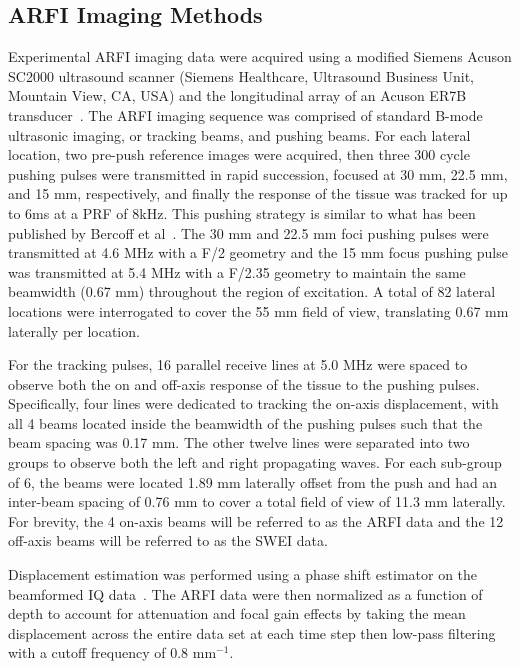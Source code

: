 \subsection{ARFI Imaging Methods}
Experimental ARFI imaging data were acquired using a modified Siemens Acuson
SC2000 ultrasound scanner (Siemens Healthcare, Ultrasound Business Unit,
Mountain View, CA, USA) and the longitudinal array of an Acuson ER7B
transducer~\cite{Rosenzweig2012}.  The ARFI imaging sequence was comprised of
standard B-mode ultrasonic imaging, or tracking beams, and pushing beams. For
each lateral location, two pre-push reference images were acquired, then three
300 cycle pushing pulses were transmitted in rapid succession, focused at 30
mm, 22.5 mm, and 15 mm, respectively, and finally the response of the tissue
was tracked for up to 6ms at a PRF of 8kHz. This pushing strategy is similar to
what has been published by Bercoff et al~\cite{BercoffSSI}. The 30 mm and 22.5
mm foci pushing pulses were transmitted at 4.6 MHz with a F/2 geometry and the
15 mm focus pushing pulse was transmitted at 5.4 MHz with a F/2.35 geometry to
maintain the same beamwidth (0.67 mm) throughout the region of excitation. A
total of 82 lateral locations were interrogated to cover the 55 mm field of
view, translating 0.67 mm laterally per location.

For the tracking pulses, 16 parallel receive lines at 5.0 MHz were spaced to
observe both the on and off-axis response of the tissue to the pushing pulses.
Specifically, four lines were dedicated to tracking the on-axis displacement,
with all 4 beams located inside the beamwidth of the pushing pulses such that
the beam spacing was 0.17 mm. The other twelve lines were separated into two
groups to observe both the left and right propagating waves. For each sub-group
of 6, the beams were located 1.89 mm laterally offset from the push and had an
inter-beam spacing of 0.76 mm to cover a total field of view of 11.3 mm
laterally. For brevity, the 4 on-axis beams will be referred to as the ARFI
data and the 12 off-axis beams will be referred to as the SWEI data.

Displacement estimation was performed using a phase shift estimator on the
beamformed IQ data~\cite{Loupas1,Pinton1}. The ARFI data were then normalized
as a function of depth to account for attenuation and focal gain effects by
taking the mean displacement across the entire data set at each time step then
low-pass filtering with a cutoff frequency of 0.8 mm$^{-1}$.
